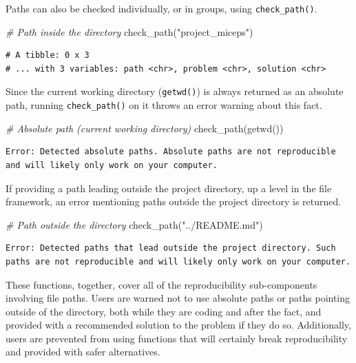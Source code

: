 \documentclass[12pt,twoside]{reedthesis}
\newenvironment{Shaded}{\begin{snugshade}}{\end{snugshade}}
\newcommand{\CommentTok}[1]{\textcolor[rgb]{0.56,0.35,0.01}{\textit{#1}}}
\newcommand{\FunctionTok}[1]{\textcolor[rgb]{0.00,0.00,0.00}{#1}}
\newcommand{\NormalTok}[1]{#1}
\newcommand{\StringTok}[1]{\textcolor[rgb]{0.31,0.60,0.02}{#1}}
\begin{document}
Paths can also be checked individually, or in groups, using \texttt{check\_path()}.
\begin{Shaded}
\begin{Highlighting}[]
\CommentTok{\# Path inside the directory}
\FunctionTok{check\_path}\NormalTok{(}\StringTok{"project\_miceps"}\NormalTok{)}
\end{Highlighting}
\end{Shaded}
\begin{verbatim}
# A tibble: 0 x 3
# ... with 3 variables: path <chr>, problem <chr>, solution <chr>
\end{verbatim}
Since the current working directory (\texttt{getwd()}) is always returned as an absolute path, running \texttt{check\_path()} on it throws an error warning about this fact.
\begin{Shaded}
\begin{Highlighting}[]
\CommentTok{\# Absolute path (current working directory)}
\FunctionTok{check\_path}\NormalTok{(}\FunctionTok{getwd}\NormalTok{())}
\end{Highlighting}
\end{Shaded}
\begin{verbatim}
Error: Detected absolute paths. Absolute paths are not reproducible
and will likely only work on your computer.
\end{verbatim}
If providing a path leading outside the project directory, up a level in the file framework, an error mentioning paths outside the project directory is returned.
\begin{Shaded}
\begin{Highlighting}[]
\CommentTok{\# Path outside the directory}
\FunctionTok{check\_path}\NormalTok{(}\StringTok{"../README.md"}\NormalTok{)}
\end{Highlighting}
\end{Shaded}
\begin{verbatim}
Error: Detected paths that lead outside the project directory. Such
paths are not reproducible and will likely only work on your computer.
\end{verbatim}
These functions, together, cover all of the reproducibility sub-components involving file paths. Users are warned not to use absolute paths or paths pointing outside of the directory, both while they are coding and after the fact, and provided with a recommended solution to the problem if they do so. Additionally, users are prevented from using functions that will certainly break reproducibility and provided with safer alternatives.
\end{document}
